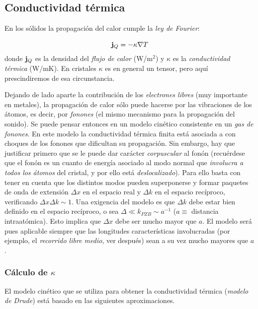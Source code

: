 \subsection{Conductividad térmica}

En los sólidos la propagación del calor cumple la \textit{ley de Fourier}:

\begin{equation}
    \mathbf{j}_Q = - \kappa \nabla T
\end{equation}
donde $\mathbf{j}_Q$ es la densidad del \textit{flujo de calor} (W/m$^2$) y $\kappa$ es la \textit{conductividad térmica} (W/mK). En cristales $\kappa$ es en general un tensor, pero aquí prescindiremos de esa circunstancia.

Dejando de lado aparte la contribución de los \textit{electrones libres} (muy importante en metales), la propagación de calor sólo puede hacerse por las vibraciones de los átomos, es decir, por \textit{fonones} (el mismo mecanismo para la propagación del sonido). Se puede pensar entonces en un modelo cinético consistente en un \textit{gas de fonones}. En este modelo la conductividad térmica finita está asociada a con choques de los fonones que dificultan su propagación. Sin embargo, hay que justificar primero que se le puede dar carácter \textit{corpuscular} al fonón (recuérdese que el fonón es un cuanto de energía asociado al modo normal que \textit{involucra a todos los átomos} del cristal, y por ello está \textit{deslocalizado}). Para ello basta con tener en cuenta que los distintos modos pueden superponerse y formar paquetes de onda de extensión $\Delta x$ en el espacio real y $\Delta k$ en el espacio recíproco, verificando $\Delta x \Delta k \sim 1$. Una exigencia del modelo es que $\Delta k$ debe estar bien definido en el espacio recíproco, o sea $\Delta \ll k_{PZB} \sim a^{-1}$ ($a\equiv$ distancia intraatómica). Esto implica que $\Delta x$ debe ser mucho mayor que $a$. El modelo será pues aplicable siempre que las longitudes características involucradas (por ejemplo, el \textit{recorrido libre medio}, ver después) sean a su vez mucho mayores que $a$. 

\subsubsection{Cálculo de $\kappa$}

El modelo cinético que se utiliza para obtener la conductividad térmica (\textit{modelo de Drude}) está basado en las siguientes aproximaciones.

